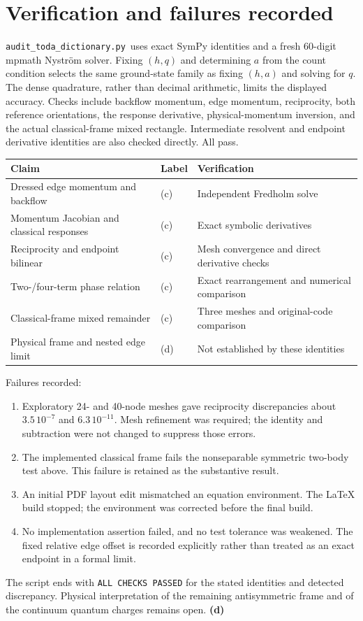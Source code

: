 \documentclass[11pt,a4paper]{article}
\newcommand{\Ld}{\textbf{(d)}\ }
\newcommand{\scr}{\texttt{audit\_\allowbreak toda\_\allowbreak dictionary.py}}
\begin{document}
\section{Verification and failures recorded}
\scr\ uses exact SymPy identities and a fresh 60-digit mpmath Nystr\"om
solver. Fixing $(h,q)$ and determining $a$ from the count condition selects
the same ground-state family as fixing $(h,a)$ and solving for $q$.
The dense quadrature, rather than decimal arithmetic, limits the displayed
accuracy. Checks include backflow momentum, edge momentum, reciprocity,
both reference orientations, the response derivative, physical-momentum
inversion, and the actual classical-frame mixed rectangle. Intermediate
resolvent and endpoint derivative identities are also checked directly. All pass.

\begin{center}\small
\begin{tabular}{p{.40\linewidth}p{.07\linewidth}p{.40\linewidth}}
\toprule Claim & Label & Verification\\\midrule
Dressed edge momentum and backflow & (c) & Independent Fredholm solve\\
Momentum Jacobian and classical responses & (c) & Exact symbolic derivatives\\
Reciprocity and endpoint bilinear & (c) & Mesh convergence and direct derivative checks\\
Two-/four-term phase relation & (c) & Exact rearrangement and numerical comparison\\
Classical-frame mixed remainder & (c) & Three meshes and original-code comparison\\
Physical frame and nested edge limit & (d) & Not established by these identities\\
\bottomrule
\end{tabular}
\end{center}

Failures recorded:
\begin{enumerate}
\item Exploratory 24- and 40-node meshes gave reciprocity discrepancies
about $3.5\,10^{-7}$ and $6.3\,10^{-11}$. Mesh refinement was required;
the identity and subtraction were not changed to suppress those errors.
\item The implemented classical frame fails the nonseparable symmetric
two-body test above. This failure is retained as the substantive result.
\item An initial PDF layout edit mismatched an equation environment. The
LaTeX build stopped; the environment was corrected before the final build.
\item No implementation assertion failed, and no test tolerance was
weakened. The fixed relative edge offset is recorded explicitly rather
than treated as an exact endpoint in a formal limit.
\end{enumerate}
The script ends with \texttt{ALL CHECKS PASSED} for the stated identities
and detected discrepancy. Physical interpretation of the remaining
antisymmetric frame and of the continuum quantum charges remains open. \Ld
\end{document}
